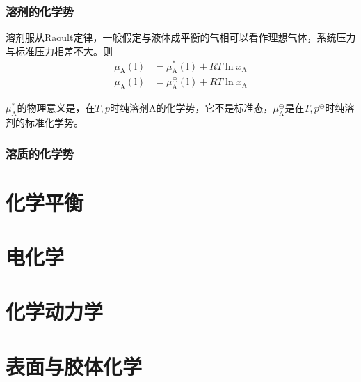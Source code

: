 \documentclass[lang=cn,newtx,11pt,scheme=chinese]{elegantbook}
\begin{document}
\subsection{溶剂的化学势}
溶剂服从Raoult定律，一般假定与液体成平衡的气相可以看作理想气体，系统压力与标准压力相差不大。则
\begin{equation}
	\begin{aligned}
		\mu_\mathrm{A}(\mathrm{l}) &= \mu^*_\mathrm{A}(\mathrm{l}) + RT \ln x_\mathrm{A} \\
		\mu_\mathrm{A}(\mathrm{l}) &= \mu^\ominus _\mathrm{A}(\mathrm{l}) + RT \ln x_\mathrm{A} 
	\end{aligned}
\end{equation}

$\mu^*_\mathrm{A}$的物理意义是，在$T,p$时纯溶剂A的化学势，它不是标准态，$\mu^\ominus_\mathrm{A}$是在$T,p^\ominus$时纯溶剂的标准化学势。

\subsection{溶质的化学势}



\chapter{化学平衡}
\chapter{电化学}
\chapter{化学动力学}
\chapter{表面与胶体化学}
\end{document}
